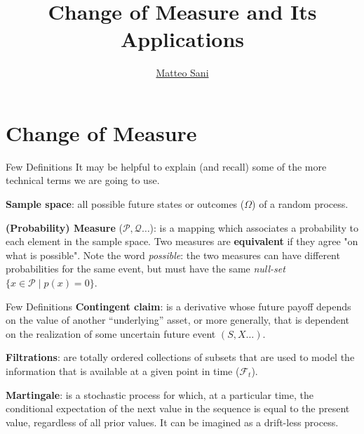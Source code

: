 \documentclass{beamer}
\title{Change of Measure and Its Applications}
\author{\href{mailto:matteo.sani@unisi.it}{Matteo Sani}}
\begin{document}
\begin{frame}[plain]
  \maketitle
\end{frame}

\section{Change of Measure}
\begin{frame}{Few Definitions}
  It may be helpful to explain (and recall) some of the more technical terms we are going to use.\newline
  
  \textbf{Sample space}: all possible future states or outcomes ($\Omega$) of a random process.\newline
  
  \textbf{(Probability) Measure} ($\mathcal{P}, \mathcal{Q}\ldots$): is a mapping which associates a probability to each element in the sample space. Two measures are \textbf{equivalent} if they agree "on what is possible". Note the word \emph{possible}: the two measures can have different probabilities for the same event, but must have the same \emph{null-set} $\{x\in {\mathcal {P}}\mid p (x)=0\}$. 
\end{frame}

\begin{frame}{Few Definitions}
  \textbf{Contingent claim}: is a derivative whose future payoff depends on the value of another “underlying” asset, or more generally, that is dependent on the realization of some uncertain future event $(S, X\ldots)$.\newline
  
  \textbf{Filtrations}: are totally ordered collections of subsets that are used to model the information that is available at a given point in time ($\mathcal{F}_t$). \newline
  
  \textbf{Martingale}: is a stochastic process for which, at a particular time, the conditional expectation of the next value in the sequence is equal to the present value, regardless of all prior values. It can be imagined as a drift-less process.
\end{frame}
\end{document}
